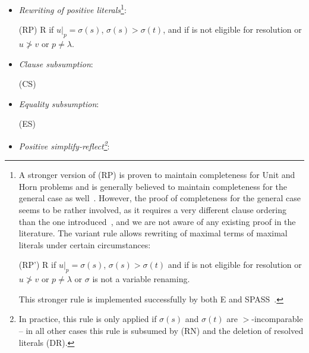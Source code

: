 \documentclass{article}
\begin{document}
\begin{definition}
\begin{itemize}
   
 \item \emph{Rewriting of positive
     literals}\footnote{A stronger version of (RP)
     is proven to maintain completeness for Unit and Horn problems
     and is generally believed to maintain completeness for the
     general case as well~\cite{Bachmair:personal-98}.  However, the
     proof of completeness for the general case seems to be rather
     involved, as it requires a very different clause ordering than
     the one introduced~\cite{BG94}, and we are not aware of any
     existing proof in the literature. The variant rule allows
     rewriting of maximal terms of maximal literals under certain
     circumstances:
     
     \medskip
     (RP')  {
       \phantom{ae}  \vee R} {if
       $u|_p = \sigma(s)$, $\sigma(s)>\sigma(t)$ and
       if  is not eligible for
       resolution or $u \not> v$ or $p \not=
       \lambda$ or $\sigma$ is not a variable renaming.}
     
     \medskip \noindent This stronger rule is implemented successfully
     by both E and
     SPASS~\cite{Weidenbach:personal-99}.}:
   
   \bigskip (RP) 
   { \phantom{ae}  \vee
     R} {if $u|_p = \sigma(s)$, $\sigma(s)>\sigma(t)$, and if
      is not eligible for resolution or $u \not> v$ or $p
     \not= \lambda$.}
   
 \item \emph{Clause subsumption}:
   
   \bigskip (CS)  
   
 \item \emph{Equality subsumption}:
   
   \bigskip (ES) 
   
 \item \emph{Positive simplify-reflect\footnote{In
       practice, this rule is only applied if $\sigma(s)$ and
       $\sigma(t)$ are $>$-incomparable -- in all other cases this
       rule is subsumed by (RN) and the deletion of resolved literals
       (DR).}}:
   

\end{itemize}
\end{definition}
\end{document}
